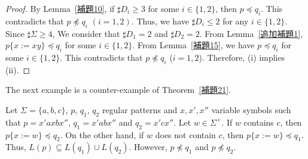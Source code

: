 \begin{proof}
    By Lemma~\ref{補題10}, if $\sharp D_{i} \geq 3$ for some $i \in \{1,2\}$,
    then $p \preceq q_{i}$.
    This contradicts that $p \not\preceq q_{i}$ $(i=1,2)$.
    Thus, we have $\sharp D_{i} \leq 2$ for any $i \in \{1,2\}$.
    Since $\sharp \Sigma \geq 4$,
    We consider that $\sharp D_{1}=2$ and $\sharp D_{2} = 2$.
    From Lemma~\ref{追加補題1}, $p\{x:=xy\} \preceq q_{i}$ for some $i \in \{1,2\}$.
    From Lemma~\ref{補題15}, we have $p \preceq q_{i}$ for some $i \in \{1,2\}$.
    This contradicts that $p \not\preceq q_{i}$ ($i=1,2$).
    Therefore, (i) implies (ii).
\end{proof}

The next example is a counter-example of Theorem~\ref{補題21}.


\begin{ex}\label{反例thm17}
    Let $\Sigma = \{a,b,c\}$, $p$, $q_{1}$, $q_{2}$ regular patterns and
    $x,x',x''$ variable symbols such that
    $p = x'axbx''$, $q_{1} = x'abx''$ and $q_{2} = x'cx''$.
    Let $w \in \Sigma^{+}$.
    If $w$ contains $c$, then $p \{x:=w\} \preceq q_{2}$.
    On the other hand, if $w$ does not contain $c$,
    then $p\{x:=w\} \preceq q_{1}$.
    Thus, $L(p) \subseteq L(q_{1}) \cup L(q_{2})$.
    However, $p \not\preceq q_{1}$ and $p \not\preceq q_{2}$.
\end{ex}

